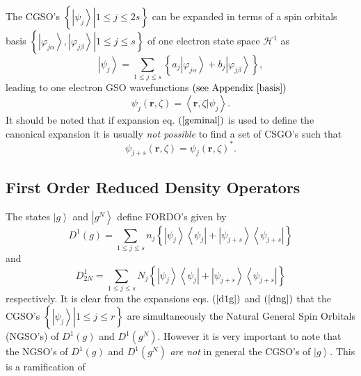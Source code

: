 \documentclass[aps,preprint]{revtex4}%
\begin{document}
The CGSO's $\left\{  \left.  \left\vert \psi_{j}\right\rangle \right\vert
1\leq j\leq2s\right\}  $ can be expanded in terms of a spin orbitals basis
$\left\{  \left.  \left\vert \varphi_{j\alpha}\right\rangle ,\left\vert
\varphi_{j\beta}\right\rangle \right\vert 1\leq j\leq s\right\}  $ of one
electron state space $\mathcal{H}^{1}$ as
\begin{equation}
\left\vert \psi_{j}\right\rangle =\sum_{1\leq j\leq s}\left\{  a_{j}\left\vert
\varphi_{j\alpha}\right\rangle +b_{j}\left\vert \varphi_{j\beta}\right\rangle
\right\}  ,
\end{equation}
leading to one electron GSO wavefunctions $\left(  \text{see Appendix
\ref{basis}}\right)  $
\begin{equation}
\psi_{j}\left(  \mathbf{r,}\zeta\right)  =\left\langle \left.  \mathbf{r,}%
\zeta\right\vert \psi_{j}\right\rangle .
\end{equation}
It should be noted that if expansion eq. $\left(  \ref{geminal}\right)  $ is
used to define the canonical expansion it is usually \emph{not possible} to
find a set of CSGO's such that
\begin{equation}
\psi_{j+s}\left(  \mathbf{r,}\zeta\right)  =\psi_{j}\left(  \mathbf{r,}%
\zeta\right)  ^{\ast}.
\end{equation}


\subsection{First Order Reduced Density Operators}

The states $\left\vert g\right\rangle $ and $\left\vert g^{N}\right\rangle $
define FORDO's given by \cite{Coleman}
\begin{equation}
D^{1}\left(  g\right)  =\sum_{1\leq j\leq s}n_{j}\left\{  \left\vert \psi
_{j}\right\rangle \left\langle \psi_{j}\right\vert +\left\vert \psi
_{j+s}\right\rangle \left\langle \psi_{j+s}\right\vert \right\}  \label{d1g}%
\end{equation}
and
\begin{equation}
D_{2N}^{1}=\sum_{1\leq j\leq s}N_{j}\left\{  \left\vert \psi_{j}\right\rangle
\left\langle \psi_{j}\right\vert +\left\vert \psi_{j+s}\right\rangle
\left\langle \psi_{j+s}\right\vert \right\}  \label{dng}%
\end{equation}
respectively. It is clear from the expansions eqs. $\left(  \ref{d1g}\right)
$ and $\left(  \ref{dng}\right)  $ that the CGSO's $\left\{  \left.
\left\vert \psi_{j}\right\rangle \right\vert 1\leq j\leq r\right\}  $ are
simultaneously the Natural General Spin Orbitals (NGSO's) of $D^{1}\left(
g\right)  $ and $D^{1}\left(  g^{N}\right)  $. However it is very important to
note that the NGSO's of $D^{1}\left(  g\right)  $ and $D^{1}\left(
g^{N}\right)  $ \emph{are not }in general the CGSO's of $\left\vert
g\right\rangle $. This is a ramification of
\end{document}
